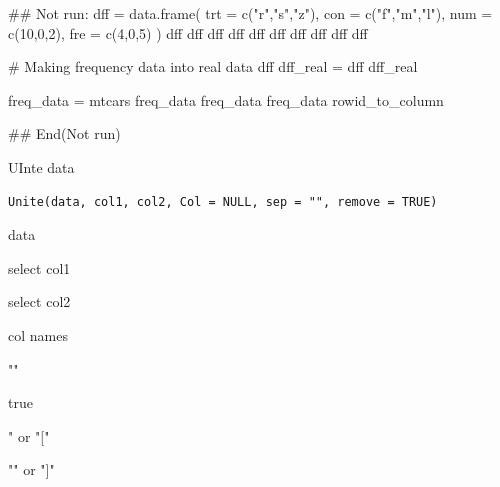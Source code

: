\documentclass[a4paper]{book}
\begin{document}
%
\begin{Examples}
\begin{ExampleCode}

\#\# Not run: 
dff = data.frame(
  trt = c("r","s","z"),
  con = c("f","m","l"),
  num = c(10,0,2),
  fre = c(4,0,5) )
dff
dff %
dff %
dff %
dff %
dff %
dff %
dff %
dff %
dff %

# Making frequency data into real data
dff %
 dff_real =  dff %
 dff_real

 freq_data =  mtcars %
 freq_data%
 freq_data%
 freq_data%
rowid_to_column

## End(Not run)

\end{ExampleCode}
\end{Examples}
%
\begin{Description}
UInte data
\end{Description}
%
\begin{Usage}
\begin{verbatim}
Unite(data, col1, col2, Col = NULL, sep = "", remove = TRUE)
\end{verbatim}
\end{Usage}
%
\begin{Arguments}
\begin{ldescription}
\item[\code{data}] data

\item[\code{col1}] select col1

\item[\code{col2}] select col2

\item[\code{Col}] col names

\item[\code{sep}] ""

\item[\code{remove}] true

\item[\code{left}] " or "["

\item[\code{right}] ""  or  "]"
\end{ldescription}
\end{Arguments}
\end{document}

